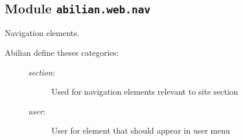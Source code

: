 \documentclass[a4paper,12pt,english]{sphinxmanual}
\begin{document}
\begin{fulllineitems}

\begin{fulllineitems}
\label{api:abilian.web.action.Action.title}
\end{fulllineitems}


\end{fulllineitems}


\begin{fulllineitems}
\label{api:abilian.web.action.ModalActionMixin}~

\begin{fulllineitems}
\label{api:abilian.web.action.ModalActionMixin.template_string}
\end{fulllineitems}


\end{fulllineitems}



\subsection{Module \texttt{abilian.web.nav}}
\label{api:module-abilian.web.nav}\label{api:module-abilian-web-nav}
Navigation elements.
\begin{description}
\item[{Abilian define theses categories:}] \leavevmode\begin{description}
\item[{\emph{section}:}] \leavevmode
Used for navigation elements relevant to site section

\item[{\emph{user}:}] \leavevmode
User for element that should appear in user menu

\end{description}

\end{description}
\end{document}
